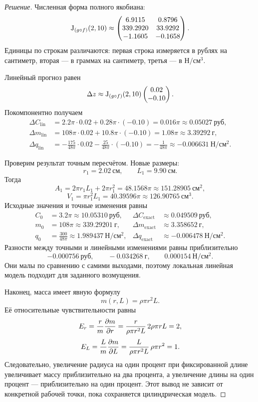 \begin{proof}[Решение]
Численная форма полного якобиана:
\[
\mathrm{J}_{(g\circ f)}(2,10)
\approx
\begin{pmatrix}
6.9115 & 0.8796\\
339.2920 & 33.9292\\
-1.1605 & -0.1658
\end{pmatrix}.
\]
Единицы по строкам различаются: первая строка измеряется в рублях на сантиметр, вторая --- в граммах на сантиметр, третья --- в \(\text{Н}/\text{см}^3\).

Линейный прогноз равен
\[
\Delta z
\approx
\mathrm{J}_{(g\circ f)}(2,10)
\begin{pmatrix}
0.02\\
-0.10
\end{pmatrix}.
\]
Покомпонентно получаем
\begin{align*}
\Delta C_{\mathrm{lin}}
&=2.2\pi\cdot0.02+0.28\pi\cdot(-0.10)
=0.016\pi\approx0.05027\ \text{руб},\\
\Delta m_{\mathrm{lin}}
&=108\pi\cdot0.02+10.8\pi\cdot(-0.10)
=1.08\pi\approx3.39292\ \text{г},\\
\Delta q_{\mathrm{lin}}
&=-\frac{175}{48\pi}\cdot0.02-\frac{25}{48\pi}\cdot(-0.10)
=-\frac{1}{48\pi}\approx-0.006631\ \text{Н}/\text{см}^2.
\end{align*}

Проверим результат точным пересчётом. Новые размеры:
\[
r_1=2.02\ \text{см},
\qquad
L_1=9.90\ \text{см}.
\]
Тогда
\[
A_1
=2\pi r_1L_1+2\pi r_1^2
=48.1568\pi
\approx151.28905\ \text{см}^2,
\]
\[
V_1
=\pi r_1^2L_1
=40.39596\pi
\approx126.90765\ \text{см}^3.
\]
Исходные значения и точные изменения равны
\begin{align*}
C_0&=3.2\pi\approx10.05310\ \text{руб},
&\Delta C_{\mathrm{exact}}&\approx0.049509\ \text{руб},\\
m_0&=108\pi\approx339.29201\ \text{г},
&\Delta m_{\mathrm{exact}}&\approx3.358652\ \text{г},\\
q_0&=\frac{300}{48\pi}\approx1.989437\ \text{Н}/\text{см}^2,
&\Delta q_{\mathrm{exact}}&\approx-0.006478\ \text{Н}/\text{см}^2.
\end{align*}
Разности между точными и линейными изменениями равны приблизительно
\[
-0.000756\ \text{руб},
\qquad
-0.034268\ \text{г},
\qquad
0.000154\ \text{Н}/\text{см}^2.
\]
Они малы по сравнению с самими выходами, поэтому локальная линейная модель подходит для заданного возмущения.

Наконец, масса имеет явную формулу
\[
m(r,L)=\rho\pi r^2L.
\]
Её относительные чувствительности равны
\[
E_r
=
\frac{r}{m}\frac{\partial m}{\partial r}
=
\frac{r}{\rho\pi r^2L}\,2\rho\pi rL
=2,
\]
\[
E_L
=
\frac{L}{m}\frac{\partial m}{\partial L}
=
\frac{L}{\rho\pi r^2L}\,\rho\pi r^2
=1.
\]
Следовательно, увеличение радиуса на один процент при фиксированной длине увеличивает массу приблизительно на два процента, а увеличение длины на один процент --- приблизительно на один процент. Этот вывод не зависит от конкретной рабочей точки, пока сохраняется цилиндрическая модель.
\end{proof}


